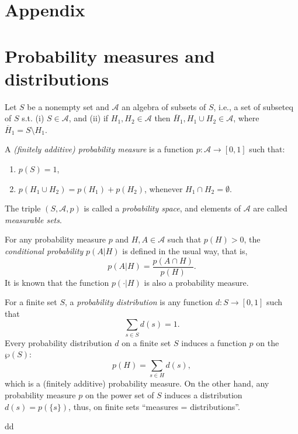 \section*{Appendix}


\appendix

\section{Probability measures and distributions}






Let $S$ be a nonempty set and $\mathcal{A}$ an algebra of subsets of $S$, 
i.e., a set of subseteq of $S$ s.t. (i) $S \in \mathcal{A}$, 
and (ii) if $H_1,H_2 \in \mathcal{A}$ then $\overline{H}_1, H_1 \cup H_2 \in \mathcal{A}$, 
where $\overline{H}_1=S\setminus H_1$.



A \textit{(finitely additive) probability measure} is a function $p \colon \mathcal{A} \to [0,1]$ such that:
\begin{enumerate}[itemsep=5pt,parsep=5pt,leftmargin=3em,topsep=5pt,label=(\arabic*)] %
    \item $p(S)=1$,
    
    \item $p(H_1 \cup H_2) = p(H_1)+p(H_2)$, 
    whenever $H_1 \cap H_2 = \emptyset$.
\end{enumerate}


The triple $(S,\mathcal{A},p)$ is called a \textit{probability space}, 
and elements of $\mathcal{A}$ are called \textit{measurable sets}.



For any probability measure $p$ and $H,A \in \mathcal{A}$ such that $p(H)>0$, 
the \textit{conditional probability} $p(A | H)$ is defined in the usual way, that is, 
\[
    p(A | H) = \dfrac{p(A \cap H)}{p(H)}. 
\]
It is known that the function $p(\cdot | H)$ is also a probability measure.





For a finite set $S$, 
a \textit{probability distribution} is any  function $d\colon S \to [0,1]$ such that 
\[
    \sum_{s \in S} d(s) = 1.
\]
Every probability distribution $d$ on a finite set $S$ induces a function $p$ on the $\wp(S)$:
\[
    p(H) = \sum_{s \in H} d(s),
\]
which is a (finitely additive) probability measure. 
% 
On the other hand,
any probability measure $p$ on the power set of $S$ induces a distribution $d(s)=p(\{s\})$, 
thus, 
on finite sets ``measures = distributions''.



\begin{df}dd
    
\end{df}